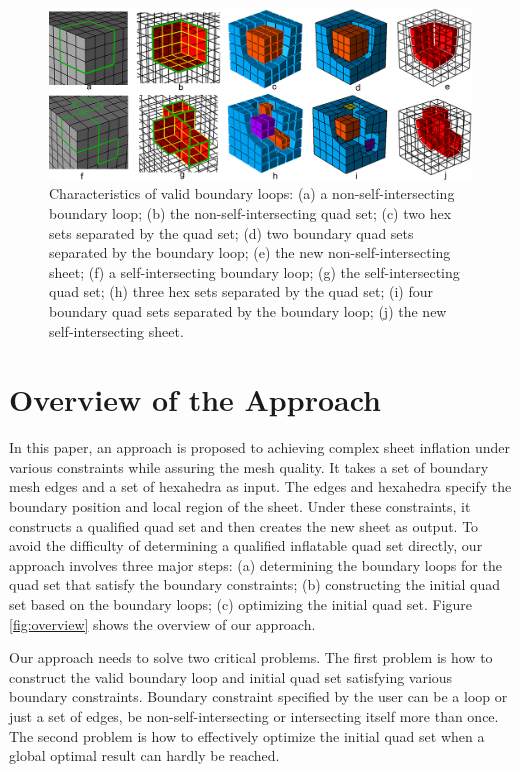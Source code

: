 \documentclass[final,5p,times,twocolumn]{elsarticle}
\begin{document}
\begin{figure}[htbp]
\begin{center}
\includegraphics[width=15cm]{figures/compo_loop_prop.png}
\caption{Characteristics of valid boundary loops: (a) a non-self-intersecting boundary loop; (b) the non-self-intersecting quad set; (c) two hex sets separated by the quad set; (d) two boundary quad sets separated by the boundary loop; (e) the new non-self-intersecting sheet; (f) a self-intersecting boundary loop; (g) the self-intersecting quad set; (h) three hex sets separated by the quad set; (i) four boundary quad sets separated by the boundary loop; (j) the new self-intersecting sheet.}
\label{fig:loop_prop}
\end{center}
\end{figure}

\section{Overview of the Approach}
\label{sec:algo_overview}

In this paper, an approach is proposed to achieving complex sheet inflation under various constraints while assuring the mesh quality. It takes a set of boundary mesh edges and a set of hexahedra as input. The edges and hexahedra specify the boundary position and local region of the sheet. Under these constraints, it constructs a qualified quad set and then creates the new sheet as output. To avoid the difficulty of determining a qualified inflatable quad set directly, our approach involves three major steps: (a) determining the boundary loops for the quad set that satisfy the boundary constraints; (b) constructing the initial quad set based on the boundary loops; (c) optimizing the initial quad set. Figure \ref{fig:overview} shows the overview of our approach.

Our approach needs to solve two critical problems. The first problem is how to construct the valid boundary loop and initial quad set satisfying various boundary constraints. Boundary constraint specified by the user can be a loop or just a set of edges, be non-self-intersecting or intersecting itself more than once. The second problem is how to effectively optimize the initial quad set when a global optimal result can hardly be reached.
\end{document}

